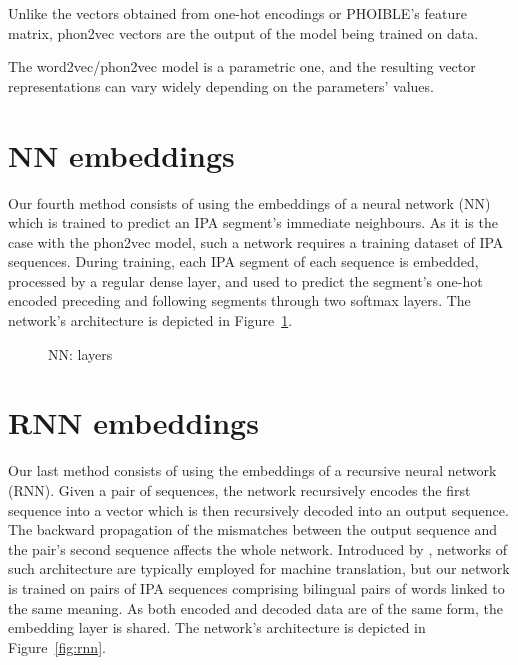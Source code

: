 \documentclass[a4paper]{report}
\begin{document}
Unlike the vectors obtained from one-hot encodings or PHOIBLE's feature matrix, phon2vec vectors are the output of the model being trained on data.

The word2vec/phon2vec model is a parametric one, and the resulting vector representations can vary widely depending on the parameters' values.


\section{NN embeddings}

Our fourth method consists of using the embeddings of a neural network (NN) which is trained to predict an IPA segment's immediate neighbours.
As it is the case with the phon2vec model, such a network requires a training dataset of IPA sequences.
During training, each IPA segment of each sequence is embedded, processed by a regular dense layer,
and used to predict the segment's one-hot encoded preceding and following segments through two softmax layers.
The network's architecture is depicted in Figure~\ref{fig:nn}.

\begin{figure}[h]
	\centering\small


	\caption{NN: layers}
	\label{fig:nn}
\end{figure}


\section{RNN embeddings}

Our last method consists of using the embeddings of a recursive neural network (RNN).
Given a pair of sequences, the network recursively encodes the first sequence into a vector which is then recursively decoded into an output sequence.
The backward propagation of the mismatches between the output sequence and the pair's second sequence affects the whole network.
Introduced by \citet{2014_Cho_al}, networks of such architecture are typically employed for machine translation,
but our network is trained on pairs of IPA sequences comprising bilingual pairs of words linked to the same meaning.
As both encoded and decoded data are of the same form, the embedding layer is shared.
The network's architecture is depicted in Figure~\ref{fig:rnn}.
\end{document}
